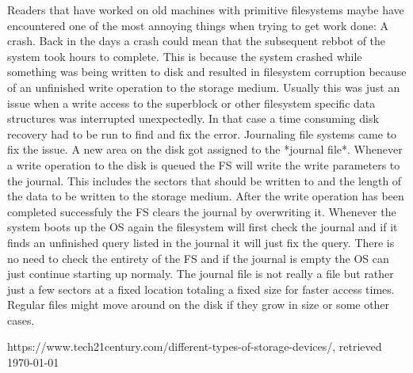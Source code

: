 Readers that have worked on old machines with primitive filesystems maybe have encountered one of the
most annoying things when trying to get work done: A crash. Back in the days a crash could mean that
the subsequent rebbot of the system took hours to complete. This is because the system crashed while
something was being written to disk and resulted in filesystem corruption because of an unfinished
write operation to the storage medium. Usually this was just an issue when a write access to the
superblock or other filesystem specific data structures was interrupted unexpectedly. In that case a
time consuming disk recovery had to be run to find and fix the error. Journaling file systems came to
fix the issue. A new area on the disk got assigned to the *journal file*. Whenever a write operation
to the disk is queued the FS will write the write parameters to the journal. This includes the sectors
that should be written to and the length of the data to be written to the storage medium. After the
write operation has been completed successfuly the FS clears the journal by overwriting it. Whenever
the system boots up the OS again the filesystem will first check the journal and if it finds an
unfinished query listed in the journal it will just fix the query. There is no need to check the
entirety of the FS and if the journal is empty the OS can just continue starting up normaly.
The journal file is not really a file but rather just a few sectors at a fixed location totaling a
fixed size for faster access times. Regular files might move around on the disk if they grow in size
or some other cases. 
  
 
\begin{thebibliography}{10}
	https://www.tech21century.com/different-types-of-storage-devices/,
	retrieved \today

\end{thebibliography}
